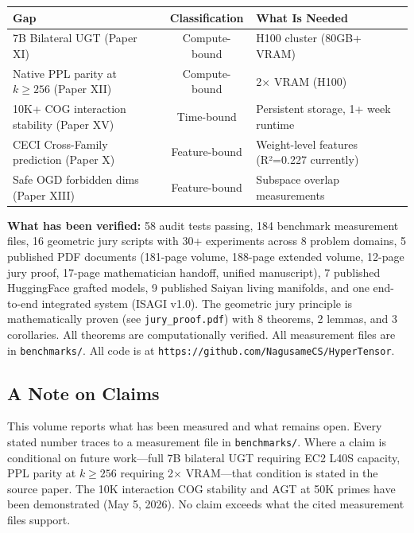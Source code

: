 \documentclass[11pt]{article}
\begin{document}
\begin{center}
\begin{tabular}{lcl}
\toprule
\textbf{Gap} & \textbf{Classification} & \textbf{What Is Needed} \\
\midrule
7B Bilateral UGT (Paper XI) & Compute-bound & H100 cluster (80GB+ VRAM) \\
Native PPL parity at $k \ge 256$ (Paper XII) & Compute-bound & 2$\times$ VRAM (H100) \\
10K+ COG interaction stability (Paper XV) & Time-bound & Persistent storage, 1+ week runtime \\
CECI Cross-Family prediction (Paper X) & Feature-bound & Weight-level features (R²=0.227 currently) \\
Safe OGD forbidden dims (Paper XIII) & Feature-bound & Subspace overlap measurements \\
\bottomrule
\end{tabular}
\end{center}

\textbf{What has been verified:} 58 audit tests passing, 184 benchmark measurement files, 16 geometric jury scripts with 30+ experiments across 8 problem domains, 5 published PDF documents (181-page volume, 188-page extended volume, 12-page jury proof, 17-page mathematician handoff, unified manuscript), 7 published HuggingFace grafted models, 9 published Saiyan living manifolds, and one end-to-end integrated system (ISAGI v1.0). The geometric jury principle is mathematically proven (see \texttt{jury\_proof.pdf}) with 8 theorems, 2 lemmas, and 3 corollaries. All theorems are computationally verified. All measurement files are in \texttt{benchmarks/}. All code is at \texttt{https://github.com/NagusameCS/HyperTensor}.

\subsection*{A Note on Claims}

This volume reports what has been measured and what remains open. Every stated number traces to a measurement file in \texttt{benchmarks/}. Where a claim is conditional on future work---full 7B bilateral UGT requiring EC2 L40S capacity, PPL parity at $k \ge 256$ requiring 2$\times$ VRAM---that condition is stated in the source paper. The 10K interaction COG stability and AGT at 50K primes have been demonstrated (May 5, 2026). No claim exceeds what the cited measurement files support.
\end{document}
